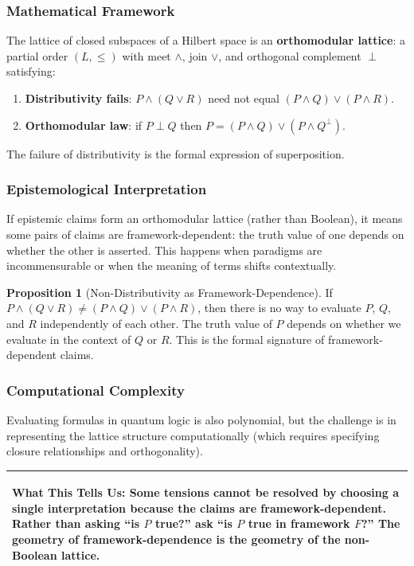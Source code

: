 \documentclass[11pt,letterpaper]{article}
\theoremstyle{definition}
\newtheorem{proposition}{Proposition}[section]
\theoremstyle{remark}
\newenvironment{insightbox}{%
  \vspace{0.3cm}%
  \noindent\begin{tabular}{|p{\dimexpr\textwidth-4\tabcolsep-2\arrayrulewidth}|}
  \hline
  \small\itshape\color{accent}
}{%
  \\ \hline
  \end{tabular}
  \vspace{0.3cm}
}
\begin{document}
\subsubsection*{Mathematical Framework}

The lattice of closed subspaces of a Hilbert space is an \textbf{orthomodular lattice}: a partial order $(L, \leq)$ with meet $\wedge$, join $\vee$, and orthogonal complement $\perp$ satisfying:

\begin{enumerate}
\item \textbf{Distributivity fails}: $P \wedge (Q \vee R)$ need not equal $(P \wedge Q) \vee (P \wedge R)$.
\item \textbf{Orthomodular law}: if $P \perp Q$ then $P = (P \wedge Q) \vee (P \wedge Q^\perp)$.
\end{enumerate}

The failure of distributivity is the formal expression of superposition.

\subsubsection*{Epistemological Interpretation}

If epistemic claims form an orthomodular lattice (rather than Boolean), it means some pairs of claims are framework-dependent: the truth value of one depends on whether the other is asserted. This happens when paradigms are incommensurable or when the meaning of terms shifts contextually.

\begin{proposition}[Non-Distributivity as Framework-Dependence]
If $P \wedge (Q \vee R) \neq (P \wedge Q) \vee (P \wedge R)$, then there is no way to evaluate $P$, $Q$, and $R$ independently of each other. The truth value of $P$ depends on whether we evaluate in the context of $Q$ or $R$. This is the formal signature of framework-dependent claims.
\end{proposition}

\subsubsection*{Computational Complexity}

Evaluating formulas in quantum logic is also polynomial, but the challenge is in representing the lattice structure computationally (which requires specifying closure relationships and orthogonality).

\begin{insightbox}
\textbf{What This Tells Us:} Some tensions cannot be resolved by choosing a single interpretation because the claims are framework-dependent. Rather than asking ``is $P$ true?'' ask ``is $P$ true in framework $F$?'' The geometry of framework-dependence is the geometry of the non-Boolean lattice.
\end{insightbox}
\end{document}
